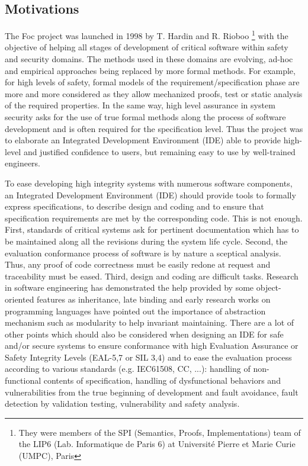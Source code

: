 

\newcommand{\foc}{{\sf Foc}}
\renewcommand{\focal}{{\sf Focal}}
\newcommand{\focalize}{{\sf FoCaLize}}

\subsection*{Motivations}

The {\foc} project was launched in 1998 by T. Hardin and R. Rioboo
\cite{HardinRiobooTSI04} \footnote{They were members of the SPI (Semantics, Proofs,
Implementations) team of the LIP6 (Lab. Informatique de Paris 6)
at Universit\'e Pierre et Marie Curie (UMPC), Paris}
with the objective of helping all stages of  development of critical software
within safety and security domains. The  methods used in these domains
are evolving, ad-hoc and empirical approaches  being replaced by more formal
methods. For example, for high levels of safety, formal models of the
requirement/specification phase are more and more considered as they
allow mechanized proofs, test or static analysis of the required
properties.  In the same way, high level assurance in system security asks for
the use of true formal methods along the process of software
development and is often required for the specification level.
Thus  the project was to elaborate an Integrated
Development Environment (IDE) able to provide high-level and justified
confidence to users, but remaining easy to use by well-trained
engineers.

To ease developing high integrity systems with numerous software
components, an Integrated Development Environment (IDE) should provide
tools to formally express specifications, to describe design and
coding and to ensure that specification requirements are met by the
corresponding code. This is not enough. First, standards of critical systems
ask for pertinent documentation which has to be maintained along all the revisions
during the system life cycle. Second, the evaluation conformance
process of software is by nature a sceptical analysis. Thus, any proof
of code correctness must be easily redone at request and traceability
must be eased. Third, design
and coding are difficult tasks. Research in software engineering has
demonstrated the help provided by some object-oriented
features as inheritance, late binding and early research works on
programming languages have pointed out the importance of abstraction
mechanism such as modularity to help invariant maintaining. There are
a lot of other points which should also be considered when designing
an IDE for safe and/or secure systems to ensure conformance with high
Evaluation Assurance or Safety Integrity Levels (EAL-5,7 or SIL 3,4)
and to ease the evaluation process according to various standards
(e.g. IEC61508, CC, ...): handling of non-functional contents of
specification, handling of dysfunctional behaviors and vulnerabilities
from the true beginning of development and fault avoidance, fault
detection by validation testing, vulnerability and safety analysis.


